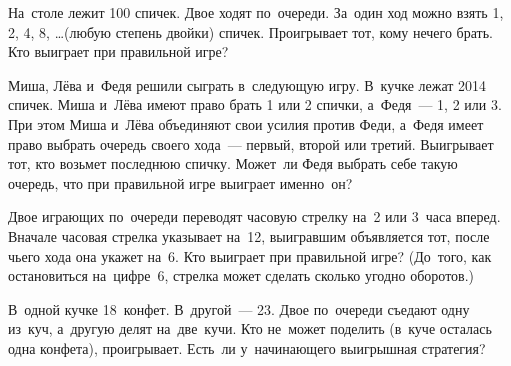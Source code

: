 \begin{problems}
\item
На~столе лежит 100 спичек.
Двое ходят по~очереди.
За~один ход можно взять 1, 2, 4, 8, \ldots (любую степень двойки) спичек.
Проигрывает тот, кому нечего брать.
Кто выиграет при правильной игре?

\item
Миша, Лёва и~Федя решили сыграть в~следующую игру.
В~кучке лежат 2014 спичек.
Миша и~Лёва имеют право брать 1 или 2 спички, а~Федя~--- 1, 2 или 3.
При этом Миша и~Лёва объединяют свои усилия против Феди, а~Федя имеет право
выбрать очередь своего хода~--- первый, второй или третий.
Выигрывает тот, кто возьмет последнюю спичку.
Может~ли Федя выбрать себе такую очередь, что при правильной игре выиграет
именно~он?

\item
Двое играющих по~очереди переводят часовую стрелку на~2 или 3~часа вперед.
Вначале часовая стрелка указывает на~12, выигравшим объявляется тот, после
чьего хода она укажет на~6.
Кто выиграет при правильной игре?
(До~того, как остановиться на~цифре~6, стрелка может сделать сколько угодно
оборотов.)

\item
В~одной кучке 18~конфет.
В~другой~--- 23.
Двое по~очереди съедают одну из~куч, а~другую делят на~две~кучи.
Кто не~может поделить (в~куче осталась одна конфета), проигрывает.
Есть~ли у~начинающего выигрышная стратегия?

\end{problems}

